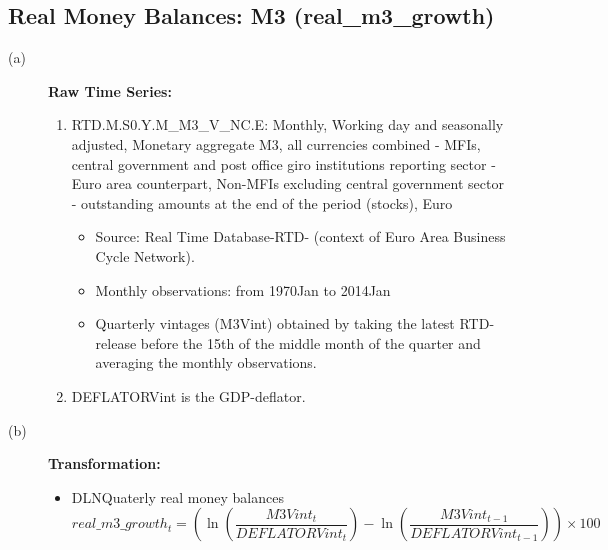 \documentclass[3p,review,times]{elsarticle}		%
\begin{document}
\subsection{Real Money Balances: M3 (real\_m3\_growth)}

\begin{description}
	\item[(a)] \textbf{Raw Time Series:} 
	\begin{enumerate}
		\item RTD.M.S0.Y.M\_M3\_V\_NC.E: Monthly, Working day and seasonally adjusted, Monetary aggregate M3, all currencies combined - MFIs, central government and post office giro institutions reporting sector - Euro area counterpart, Non-MFIs excluding central government sector - outstanding amounts at the end of the period (stocks), Euro
		
		\begin{itemize}
			\item Source: Real Time Database-RTD- (context of Euro Area Business Cycle Network). 
			\item Monthly observations: from 1970Jan to 2014Jan 
			\item Quarterly vintages (M3Vint) obtained by taking the latest RTD-release before the 15th of the middle month of the quarter and averaging the monthly observations. 
		\end{itemize}
		\item  DEFLATORVint is the GDP-deflator.
	\end{enumerate}
	\item[(b)] \textbf{Transformation:}
	\begin{itemize}
		\item DLNQuaterly real money balances
		$$real\_m3\_growth_{t}=\left(\ln\left(\frac{M3Vint_t}{DEFLATORVint_t}\right)-\ln\left(\frac{M3Vint_{t-1}}{DEFLATORVint_{t-1}}\right)\right)\times 100$$
	\end{itemize}
\end{description}
\end{document}
